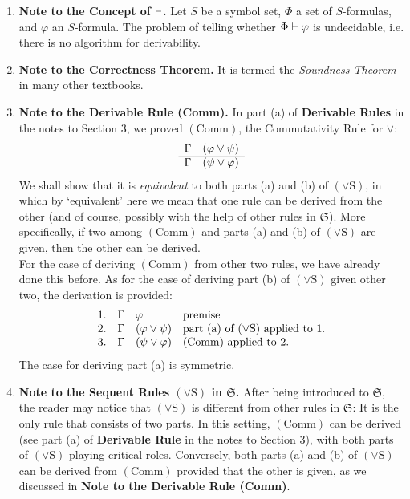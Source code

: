 \begin{enumerate}[1.]
\begin{enumerate}[(1)]
\end{enumerate}
%
\item \textbf{Note to the Concept of $\vdash$.} Let $S$ be a symbol set, $\Phi$ a set of $S$-formulas, and $\varphi$ an $S$-formula. The problem of telling whether $\Phi \vdash \varphi$ is undecidable, i.e. there is no algorithm for derivability.
%
\item \textbf{Note to the Correctness Theorem.} It is termed the \emph{Soundness Theorem} in many other textbooks.
%
\item \textbf{Note to the Derivable Rule (Comm).} In part (a) of \textbf{Derivable Rules} in the notes to Section 3, we proved $(\mathrm{Comm})$, the Commutativity Rule for $\lor$:
\[
\begin{array}{ll}
\Gamma & (\varphi \lor \psi) \cr\hline
\Gamma & (\psi \lor \varphi)
\end{array}
\]
We shall show that it is \emph{equivalent} to both parts (a) and (b) of $(\lor\mathrm{S})$, in which by `equivalent' here we mean that one rule can be derived from the other (and of course, possibly with the help of other rules in $\mathfrak{S}$). More specifically, if two among $(\mathrm{Comm})$ and parts (a) and (b) of $(\lor\mathrm{S})$ are given, then the other can be derived.\newline
\\
For the case of deriving $(\mathrm{Comm})$ from other two rules, we have already done this before. As for the case of deriving part (b) of $(\lor\mathrm{S})$ given other two, the derivation is provided:
\[
\begin{array}{llll}
1. & \Gamma & \varphi & \mbox{premise} \cr
2. & \Gamma & (\varphi \lor \psi) & \mbox{part $(\mathrm{a})$ of $(\lor\mathrm{S})$ applied to 1.} \cr
3. & \Gamma & (\psi \lor \varphi) & \mbox{$(\mathrm{Comm})$ applied to 2.}
\end{array}
\]
The case for deriving part (a) is symmetric.
%
\item \textbf{Note to the Sequent Rules $(\lor\mathrm{S})$ in $\mathfrak{S}$.} After being introduced to $\mathfrak{S}$, the reader may notice that $(\lor\mathrm{S})$ is different from other rules in $\mathfrak{S}$: It is the only rule that consists of two parts. In this setting, $(\mathrm{Comm})$ can be derived (see part (a) of \textbf{Derivable Rule} in the notes to Section 3), with both parts of $(\lor\mathrm{S})$ playing critical roles. Conversely, both parts (a) and (b) of $(\lor\mathrm{S})$ can be derived from $(\mathrm{Comm})$ provided that the other is given, as we discussed in \textbf{Note to the Derivable Rule (Comm)}.\newline

\end{enumerate}
